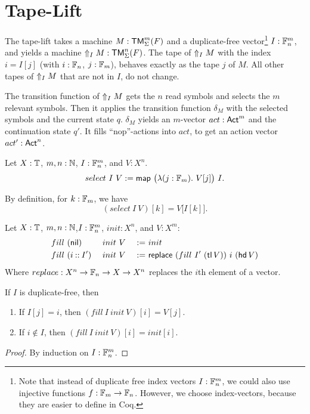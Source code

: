 \section{Tape-Lift}
\label{sec:n-Lift}

The tape-lift takes a machine $M:\TM_\Sigma^m(F)$ and a duplicate-free vector\footnote{ Note that instead of duplicate free index vectors
  $I:\Fin_n^m$, we could also use injective functions $f: \Fin_m \to \Fin_n$.  However, we choose index-vectors, because they are easier to define in
  Coq.}  $I: \Fin_n^m$, and yields a machine $\LiftTapes{M}{I} : \TM_\Sigma^n(F)$.  The tape of $\LiftTapes{M}{I}$ with the index $i = I[j]$ (with
$i:\Fin_n$, $j:\Fin_m$), behaves exactly as the tape $j$ of $M$. All other tapes of $\LiftTapes{M}{I}$ that are not in $I$, do not change.


The transition function of $\LiftTapes{M}{I}$ gets the $n$ read symbols and selects the $m$ relevant symbols.  Then it applies the transition function
$\delta_M$ with the selected symbols and the current state $q$.  $\delta_M$ yields an $m$-vector $act:\Act^m$ and the continuation state $q'$.  It
fills ``nop''-actions into $act$, to get an action vector $act':\Act^n$.

\begin{definition}
  \label{def:select}
  Let $X:\Type$, $m,n:\Nat$, $I : \Fin_n^m$, and $V : X^n$.
  \[ select~I~V := \map{\bigl(\lambda (j:\Fin_m).~V[j] \bigr)}{I}. \]
\end{definition}
\begin{lemma}
  By definition, for $k:\Fin_m$, we have
  \[
    (select~I~V)[k]=V\bigl[I[k]\bigr].
  \]
\end{lemma}

\begin{definition}
  Let $X:\Type$, $m,n:\Nat$,$I:\Fin_n^m$, $init:X^n$, and $V:X^m$:
  \begin{alignat*}{3}
    & fill~(\nil      )&& ~init~V &~:=~& init \\
    & fill~(i \cons I')&& ~init~V &~:=~& \MS{replace}~(fill~I'~(\tl V))~i~(\hd V)
  \end{alignat*}
  Where $replace : X^n \to \Fin_n \to X \to X^n$ replaces the $i$th element of a vector.
\end{definition}
\begin{lemma}
  If $I$ is duplicate-free, then
  \begin{enumerate}
  \item \label{lem:fill_correct_nth}
    If $I[j]=i$, then $(fill~I~init~V)[i] = V[j]$.
  \item \label{lem:fill_not_index}
    If $i \notin I$, then $(fill~I~init~V)[i] = init[i]$.
  \end{enumerate}
\end{lemma}
\begin{proof}
  By induction on $I : \Fin_n^m$.
\end{proof}

